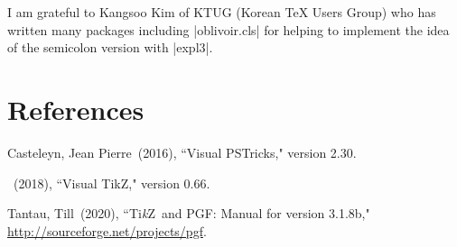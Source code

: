 \documentclass[a4paper,amsmath,chapter]{oblivoir}
\newcommand*\Tikz{Ti\textit{k}Z}
\let\TikZ\Tikz
\def\hpara{\hangpara{1.52em}{1}}
\begin{document}
I am grateful to Kangsoo Kim of KTUG (Korean TeX Users Group) who has written many packages including |oblivoir.cls| for helping to implement the idea of the semicolon version with |expl3|.

\chapter*{References}

\hpara{}Casteleyn, Jean Pierre~(2016), ``Visual PSTricks," version 2.30.

\hpara{}\uline{\hphantom{Casteleyn, Jean Pierre}}~(2018), ``Visual TikZ," version 0.66.

\hpara{}Tantau, Till~(2020), ``\TikZ\ and PGF: Manual for version 3.1.8b," \url{http://sourceforge.net/projects/pgf}.

\clearpage
\printindex
\end{document}

